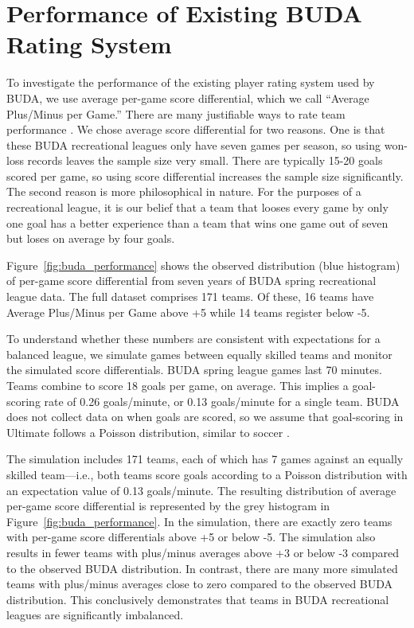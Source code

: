 \section{Performance of Existing BUDA Rating System}\label{sec:existing_performance}

To investigate the performance of the existing player rating system used by BUDA, we use average per-game score differential, which we call ``Average Plus/Minus per Game.'' There are many justifiable ways to rate team performance \cite{Langville_2012}.  We chose average score differential for two reasons.  One is that these BUDA recreational leagues only have seven games per season, so using won-loss records leaves the sample size very small.  There are typically 15-20 goals scored per game, so using score differential increases the sample size significantly.  The second reason is more philosophical in nature.  For the purposes of a recreational league, it is our belief that a team that looses every game by only one goal has a better experience than a team that wins one game out of seven but loses on average by four goals.  

Figure~\ref{fig:buda_performance} shows the observed distribution (blue histogram) of per-game score differential from seven years of BUDA spring recreational league data.  The full dataset comprises 171 teams.  Of these, 16 teams have Average Plus/Minus per Game above +5 while 14 teams register below -5.  

To understand whether these numbers are consistent with expectations for a balanced league, we simulate games between equally skilled teams and monitor the simulated score differentials.  BUDA spring league games last 70 minutes.  Teams combine to score 18 goals per game, on average. This implies a goal-scoring rate of 0.26 goals/minute, or 0.13 goals/minute for a single team.  BUDA does not collect data on when goals are scored, so we assume that goal-scoring in Ultimate follows a Poisson distribution, similar to soccer \cite{Heuer_2010}.

The simulation includes 171 teams, each of which has 7 games against an equally skilled team---i.e., both teams score goals according to a Poisson distribution with an expectation value of 0.13 goals/minute. The resulting distribution of average per-game score differential is represented by the grey histogram in Figure~\ref{fig:buda_performance}.  In the simulation, there are exactly zero teams with per-game score differentials above +5 or below -5.  The simulation also results in fewer teams with plus/minus averages above +3 or below -3 compared to the observed BUDA distribution.  In contrast, there are many more simulated teams with plus/minus averages close to zero compared to the observed BUDA distribution.  This conclusively demonstrates that teams in BUDA recreational leagues are significantly imbalanced.

